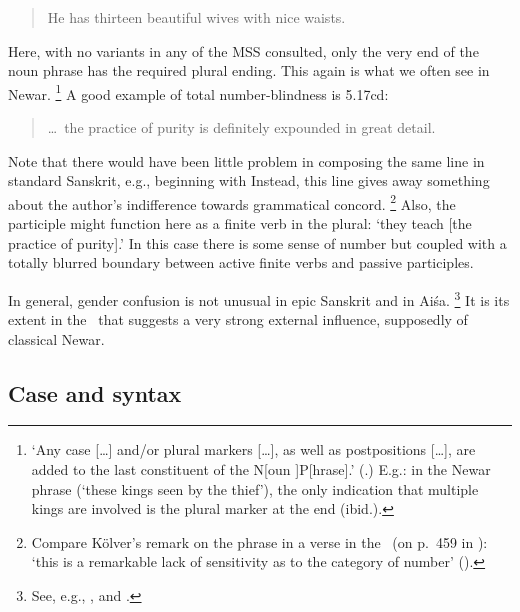 \begin{quote}

       He has thirteen beautiful wives with nice waists.
\end{quote}

\noindent
Here, with no variants in any of the MSS consulted, only the very end 
of the noun phrase  has the required 
plural ending. This again is what we often see in Newar.%
		\footnote{`Any case [\dots] and/or plural markers [\dots], as well as 
		postpositions [\dots], are added to the last constituent of the 
		N[oun ]P[hrase].' (.)
		E.g.: in the Newar phrase 
		(`these kings seen by the thief'), the only indication that
		multiple kings are involved is the plural marker 
		at the end (ibid.).}
A good example of total number-blindness is 5.17cd: 

\begin{quote}

\dots\ the practice of purity is definitely expounded in great detail.
\end{quote}

\noindent
Note that there would have been little problem in composing the same
line in standard Sanskrit, e.g., beginning with 
Instead, this line gives away something about the author's indifference
towards grammatical concord.%
		\footnote{Compare Kölver's remark on the phrase 
		in a verse in the \SvayP\ (on p.~459 in ):
		`this is a remarkable lack of sensitivity as to the category of number'
		().}
Also, the participle  might
function here as a finite verb in the plural: `they teach [the practice of purity].'
In this case there is some sense of number but coupled with a totally 
blurred boundary between active finite verbs and passive participles.


In general, gender confusion is not unusual in epic Sanskrit and in Aiśa.%
		\footnote{See, e.g., , and
									.}
It is its extent in the \VSS\ that suggests a very strong external influence,
supposedly of classical Newar.									





\subsection{Case and syntax}

